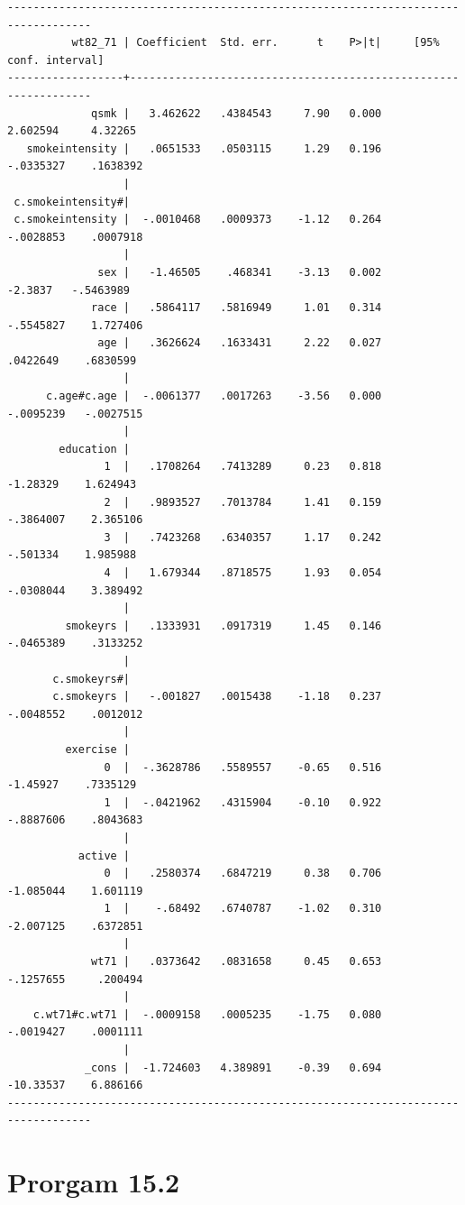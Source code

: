 \documentclass[
  10pt,
  a4paper,
]{book}
\begin{document}
\begin{verbatim}
-----------------------------------------------------------------------------------
          wt82_71 | Coefficient  Std. err.      t    P>|t|     [95% conf. interval]
------------------+----------------------------------------------------------------
             qsmk |   3.462622   .4384543     7.90   0.000     2.602594     4.32265
   smokeintensity |   .0651533   .0503115     1.29   0.196    -.0335327    .1638392
                  |
 c.smokeintensity#|
 c.smokeintensity |  -.0010468   .0009373    -1.12   0.264    -.0028853    .0007918
                  |
              sex |   -1.46505    .468341    -3.13   0.002      -2.3837   -.5463989
             race |   .5864117   .5816949     1.01   0.314    -.5545827    1.727406
              age |   .3626624   .1633431     2.22   0.027     .0422649    .6830599
                  |
      c.age#c.age |  -.0061377   .0017263    -3.56   0.000    -.0095239   -.0027515
                  |
        education |
               1  |   .1708264   .7413289     0.23   0.818     -1.28329    1.624943
               2  |   .9893527   .7013784     1.41   0.159    -.3864007    2.365106
               3  |   .7423268   .6340357     1.17   0.242     -.501334    1.985988
               4  |   1.679344   .8718575     1.93   0.054    -.0308044    3.389492
                  |
         smokeyrs |   .1333931   .0917319     1.45   0.146    -.0465389    .3133252
                  |
       c.smokeyrs#|
       c.smokeyrs |   -.001827   .0015438    -1.18   0.237    -.0048552    .0012012
                  |
         exercise |
               0  |  -.3628786   .5589557    -0.65   0.516     -1.45927    .7335129
               1  |  -.0421962   .4315904    -0.10   0.922    -.8887606    .8043683
                  |
           active |
               0  |   .2580374   .6847219     0.38   0.706    -1.085044    1.601119
               1  |    -.68492   .6740787    -1.02   0.310    -2.007125    .6372851
                  |
             wt71 |   .0373642   .0831658     0.45   0.653    -.1257655     .200494
                  |
    c.wt71#c.wt71 |  -.0009158   .0005235    -1.75   0.080    -.0019427    .0001111
                  |
            _cons |  -1.724603   4.389891    -0.39   0.694    -10.33537    6.886166
-----------------------------------------------------------------------------------
\end{verbatim}

\section{Prorgam 15.2}\label{prorgam-15.2}
\end{document}
